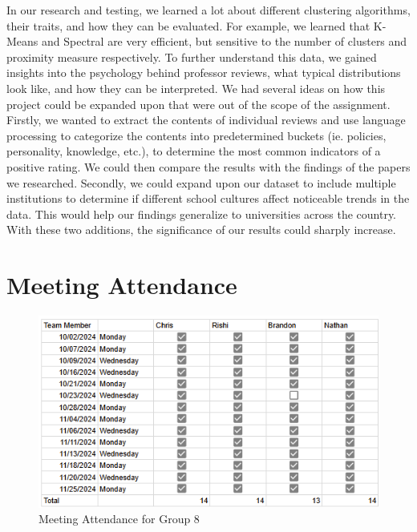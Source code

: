 \documentclass[sigconf,nonacm]{acmart}
\begin{document}
In our research and testing, we learned a lot about different clustering algorithms, their traits, and how they can be evaluated. For example, we learned that K-Means and Spectral are very efficient, but sensitive to the number of clusters and proximity measure respectively. To further understand this data, we gained insights into the psychology behind professor reviews, what typical distributions look like, and how they can be interpreted. We had several ideas on how this project could be expanded upon that were out of the scope of the assignment. Firstly, we wanted to extract the contents of individual reviews and use language processing to categorize the contents into predetermined buckets (ie. policies, personality, knowledge, etc.), to determine the most common indicators of a positive rating. We could then compare the results with the findings of the papers we researched. Secondly, we could expand upon our dataset to include multiple institutions to determine if different school cultures affect noticeable trends in the data. This would help our findings generalize to universities across the country. With these two additions, the significance of our results could sharply increase.

\newpage

\section{Meeting Attendance}

\begin{figure}[H]
    \centering
    \includegraphics[width=1\linewidth]{updated_attendance.png}
    \caption{Meeting Attendance for Group 8}
    \label{fig:enter-label}
\end{figure}

  
  
\end{document}
